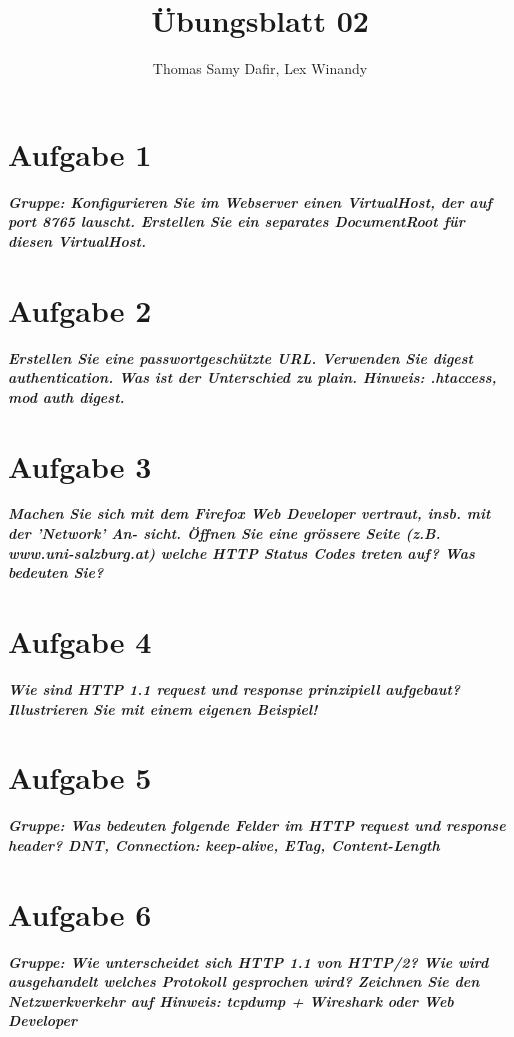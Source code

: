 \documentclass[12pt, a4paper]{report}
\title{Übungsblatt 02}
\author{Thomas Samy Dafir, Lex Winandy}
\date{}
\begin{document}
\maketitle

\section*{Aufgabe 1}
\textbf{\textit{Gruppe: Konfigurieren Sie im Webserver einen VirtualHost, der auf port 8765 lauscht.
Erstellen Sie ein separates DocumentRoot für diesen VirtualHost.}}


\section*{Aufgabe 2}
\textbf{\textit{Erstellen Sie eine passwortgeschützte URL. Verwenden Sie digest authentication. Was ist
der Unterschied zu plain. Hinweis: .htaccess, mod auth digest.}}

\section*{Aufgabe 3}
\textbf{\textit{Machen Sie sich mit dem Firefox Web Developer vertraut, insb. mit der ’Network’ An-
sicht. Öffnen Sie eine grössere Seite (z.B. www.uni-salzburg.at) welche HTTP Status
Codes treten auf? Was bedeuten Sie?}}

\section*{Aufgabe 4}
\textbf{\textit{Wie sind HTTP 1.1 request und response prinzipiell aufgebaut? Illustrieren Sie mit einem
eigenen Beispiel!}}

\section*{Aufgabe 5}
\textbf{\textit{Gruppe: Was bedeuten folgende Felder im HTTP request und response header? DNT,
Connection: keep-alive, ETag, Content-Length}}

\section*{Aufgabe 6}
\textbf{\textit{Gruppe: Wie unterscheidet sich HTTP 1.1 von HTTP/2? Wie wird ausgehandelt welches
Protokoll gesprochen wird? Zeichnen Sie den Netzwerkverkehr auf Hinweis: tcpdump +
Wireshark oder Web Developer}}
\end{document}
